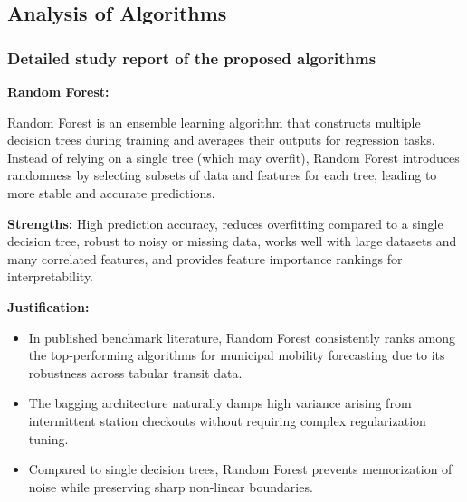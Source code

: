 \documentclass[12pt, a4paper]{article}
\renewcommand{\_}{\textunderscore\allowbreak}
\begin{document}
\subsection{Analysis of Algorithms}

\subsubsection{Detailed study report of the proposed algorithms}

\noindent \textbf{Random Forest:}

Random Forest is an ensemble learning algorithm that constructs multiple decision trees during training and averages their outputs for regression tasks. Instead of relying on a single tree (which may overfit), Random Forest introduces randomness by selecting subsets of data and features for each tree, leading to more stable and accurate predictions.

\vspace{0.2cm}
\noindent \textbf{Strengths:} High prediction accuracy, reduces overfitting compared to a single decision tree, robust to noisy or missing data, works well with large datasets and many correlated features, and provides feature importance rankings for interpretability.

\vspace{0.2cm}
\noindent \textbf{Justification:}
\begin{itemize}
    \item In published benchmark literature, Random Forest consistently ranks among the top-performing algorithms for municipal mobility forecasting due to its robustness across tabular transit data.
    \item The bagging architecture naturally damps high variance arising from intermittent station checkouts without requiring complex regularization tuning.
    \item Compared to single decision trees, Random Forest prevents memorization of noise while preserving sharp non-linear boundaries.
\end{itemize}
\end{document}
